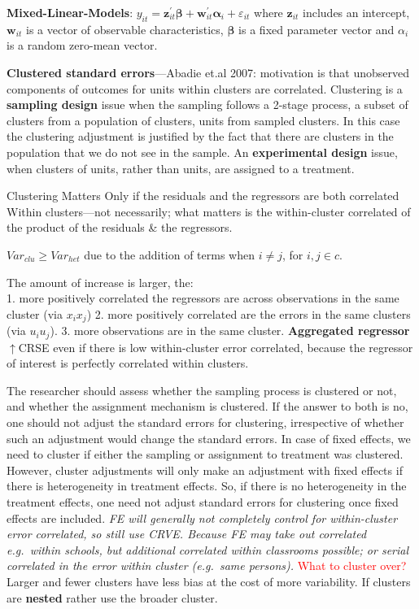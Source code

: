 \documentclass[
]{article}
\begin{document}
\textbf{Mixed-Linear-Models}:
\(y_{i t}=\mathbf{z}_{i t}^{\prime} \boldsymbol{\beta}+\mathbf{w}_{i t}^{\prime} \boldsymbol{\alpha}_{i}+\varepsilon_{i t}\)
where \(\mathbf{z}_{i t}\) includes an intercept, \(\mathbf{w}_{i t}\)
is a vector of observable characteristics, \(\boldsymbol{\beta}\) is a
fixed parameter vector and \(\alpha_{i}\) is a random zero-mean vector.

\textbf{Clustered standard errors}---Abadie et.al 2007: motivation is
that unobserved components of outcomes for units within clusters are
correlated. Clustering is a \textbf{sampling design} issue when the
sampling follows a 2-stage process, a subset of clusters from a
population of clusters, units from sampled clusters. In this case the
clustering adjustment is justified by the fact that there are clusters
in the population that we do not see in the sample. An
\textbf{experimental design} issue, when clusters of units, rather than
units, are assigned to a treatment.

Clustering Matters Only if the residuals and the regressors are both
correlated Within clusters---not necessarily; what matters is the
within-cluster correlated of the product of the residuals \& the
regressors.

\(Var_{clu} \ge Var_{het}\) due to the addition of terms when
\(i \ne j\), for \(i, j \in c\).

The amount of increase is larger, the:\\
1. more positively correlated the regressors are across observations in
the same cluster (via \(x_i x_j\)) 2. more positively correlated are the
errors in the same clusters (via \(u_iu_j\)). 3. more observations are
in the same cluster. \textbf{Aggregated regressor} \(\uparrow\)CRSE even
if there is low within-cluster error correlated, because the regressor
of interest is perfectly correlated within clusters.

The researcher should assess whether the sampling process is clustered
or not, and whether the assignment mechanism is clustered. If the answer
to both is no, one should not adjust the standard errors for clustering,
irrespective of whether such an adjustment would change the standard
errors. In case of fixed effects, we need to cluster if either the
sampling or assignment to treatment was clustered. However, cluster
adjustments will only make an adjustment with fixed effects if there is
heterogeneity in treatment effects. So, if there is no heterogeneity in
the treatment effects, one need not adjust standard errors for
clustering once fixed effects are included. \emph{FE will generally not
completely control for within-cluster error correlated, so still use
CRVE. Because FE may take out correlated e.g.~within schools, but
additional correlated within classrooms possible; or serial correlated
in the error within cluster (e.g.~same persons).}
\textcolor{red}{What to cluster over?} Larger and fewer clusters have
less bias at the cost of more variability. If clusters are
\textbf{nested} rather use the broader cluster.
\end{document}
